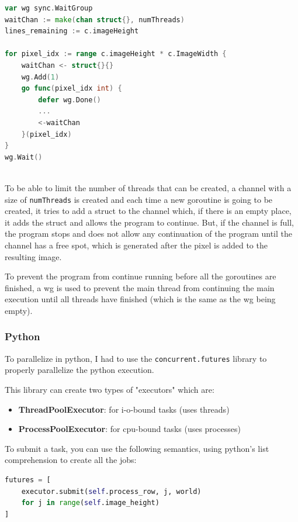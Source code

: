 \begin{lstlisting}[language=Go, caption={Goroutines.}, label={lst:go_goroutines_example}]
var wg sync.WaitGroup
waitChan := make(chan struct{}, numThreads)
lines_remaining := c.imageHeight

for pixel_idx := range c.imageHeight * c.ImageWidth {
    waitChan <- struct{}{}
    wg.Add(1)
    go func(pixel_idx int) { 
        defer wg.Done()
        ... 
        <-waitChan 
    }(pixel_idx)
}
wg.Wait()
    
\end{lstlisting}

To be able to limit the number of threads that can be created, a channel with a size of \texttt{numThreads} is created and each time a new \gls{goroutine} is going to be created, it tries to add a struct to the channel which, if there is an empty place, it adds the struct and allows the program to continue. But, if the channel is full, the program stops and does not allow any continuation of the program until the channel has a free spot, which is generated after the pixel is added to the resulting image.

To prevent the program from continue running before all the \glspl{goroutine} are finished, a \gls{wg} is used to prevent the main thread from continuing the main execution until all threads have finished (which is the same as the \gls{wg} being empty).

\subsubsection{Python}

To parallelize in python, I had to use the \texttt{concurrent.futures} library to properly parallelize the python execution.

This library can create two types of "executors" which are:
\begin{itemize}
    \item \textbf{ThreadPoolExecutor}: for \gls{i-o}-bound tasks (uses threads)
    \item \textbf{ProcessPoolExecutor}: for \gls{cpu}-bound tasks (uses processes)
\end{itemize}
To submit a task, you can use the following semantics, using python's list comprehension to create all the jobs:
\begin{lstlisting}[language=Python, caption={Python submiting jobs ProcessPoolExecutor.}, label={lst:python_executor_sumbit}]
futures = [
    executor.submit(self.process_row, j, world)
    for j in range(self.image_height)
]
\end{lstlisting}

